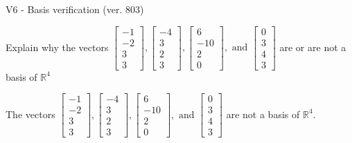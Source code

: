 \begin{exercise}
  \begin{exerciseTitle}V6 - Basis verification (ver. 803)\end{exerciseTitle}
  \begin{exerciseStatement}
    Explain why the vectors \(\left[\begin{array}{r}
-1 \\
-2 \\
3 \\
3
\end{array}\right] , \left[\begin{array}{r}
-4 \\
3 \\
2 \\
3
\end{array}\right] , \left[\begin{array}{r}
6 \\
-10 \\
2 \\
0
\end{array}\right] , \text{ and } \left[\begin{array}{r}
0 \\
3 \\
4 \\
3
\end{array}\right]\) are or are not a basis of \(\mathbb{R}^4\)	


  \end{exerciseStatement}
  \begin{exerciseAnswer}
   The vectors \(\left[\begin{array}{r}
-1 \\
-2 \\
3 \\
3
\end{array}\right] , \left[\begin{array}{r}
-4 \\
3 \\
2 \\
3
\end{array}\right] , \left[\begin{array}{r}
6 \\
-10 \\
2 \\
0
\end{array}\right] , \text{ and } \left[\begin{array}{r}
0 \\
3 \\
4 \\
3
\end{array}\right]\) 
  	 are not  a basis of \(\mathbb{R}^4\).
  


  \end{exerciseAnswer}
\end{exercise}